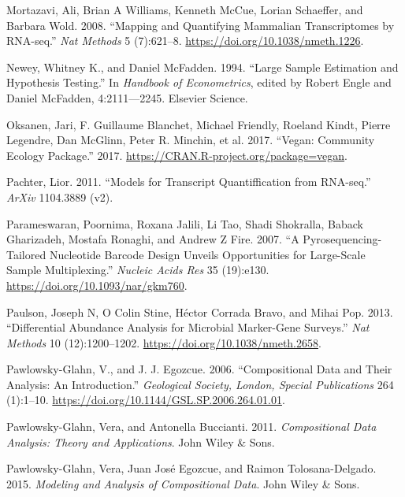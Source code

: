 \documentclass[onecolumn]{book}
\theoremstyle{definition}
\theoremstyle{definition}
\theoremstyle{definition}
\theoremstyle{remark}
\begin{document}
\leavevmode\hypertarget{ref-Mortazavi:2008}{}%
Mortazavi, Ali, Brian A Williams, Kenneth McCue, Lorian Schaeffer, and
Barbara Wold. 2008. ``Mapping and Quantifying Mammalian Transcriptomes
by RNA-seq.'' \emph{Nat Methods} 5 (7):621--8.
\url{https://doi.org/10.1038/nmeth.1226}.

\leavevmode\hypertarget{ref-Newey:1994}{}%
Newey, Whitney K., and Daniel McFadden. 1994. ``Large Sample Estimation
and Hypothesis Testing.'' In \emph{Handbook of Econometrics}, edited by
Robert Engle and Daniel McFadden, 4:2111---2245. Elsevier Science.

\leavevmode\hypertarget{ref-vegan:2017}{}%
Oksanen, Jari, F. Guillaume Blanchet, Michael Friendly, Roeland Kindt,
Pierre Legendre, Dan McGlinn, Peter R. Minchin, et al. 2017. ``Vegan:
Community Ecology Package.'' 2017.
\url{https://CRAN.R-project.org/package=vegan}.

\leavevmode\hypertarget{ref-Pachter:2011}{}%
Pachter, Lior. 2011. ``Models for Transcript Quantiffication from
RNA-seq.'' \emph{ArXiv} 1104.3889 (v2).

\leavevmode\hypertarget{ref-Parameswaran:2007aa}{}%
Parameswaran, Poornima, Roxana Jalili, Li Tao, Shadi Shokralla, Baback
Gharizadeh, Mostafa Ronaghi, and Andrew Z Fire. 2007. ``A
Pyrosequencing-Tailored Nucleotide Barcode Design Unveils Opportunities
for Large-Scale Sample Multiplexing.'' \emph{Nucleic Acids Res} 35
(19):e130. \url{https://doi.org/10.1093/nar/gkm760}.

\leavevmode\hypertarget{ref-Paulson:2013aa}{}%
Paulson, Joseph N, O Colin Stine, Héctor Corrada Bravo, and Mihai Pop.
2013. ``Differential Abundance Analysis for Microbial Marker-Gene
Surveys.'' \emph{Nat Methods} 10 (12):1200--1202.
\url{https://doi.org/10.1038/nmeth.2658}.

\leavevmode\hypertarget{ref-Pawlowsky-Glahn:2006}{}%
Pawlowsky-Glahn, V., and J. J. Egozcue. 2006. ``Compositional Data and
Their Analysis: An Introduction.'' \emph{Geological Society, London,
Special Publications} 264 (1):1--10.
\url{https://doi.org/10.1144/GSL.SP.2006.264.01.01}.

\leavevmode\hypertarget{ref-pawlowsky2011compositional}{}%
Pawlowsky-Glahn, Vera, and Antonella Buccianti. 2011.
\emph{Compositional Data Analysis: Theory and Applications}. John Wiley
\& Sons.

\leavevmode\hypertarget{ref-pawlowsky2015modeling}{}%
Pawlowsky-Glahn, Vera, Juan José Egozcue, and Raimon Tolosana-Delgado.
2015. \emph{Modeling and Analysis of Compositional Data}. John Wiley \&
Sons.
\end{document}
